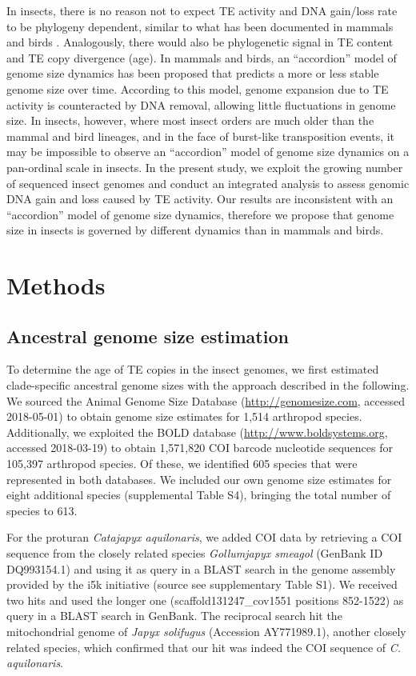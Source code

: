 In insects, there is no reason not to expect TE activity and DNA
gain/loss rate to be phylogeny dependent, similar to what has been
documented in mammals and birds \citep{Kapusta2017a}. Analogously, there
would also be phylogenetic signal in TE content and TE copy divergence
(age). In mammals and birds, an ``accordion'' model of genome size
dynamics has been proposed \citep{Kapusta2017a} that predicts a more or
less stable genome size over time. According to this model, genome
expansion due to TE activity is counteracted by DNA removal, allowing
little fluctuations in genome size. In insects, however, where most
insect orders are much older than the mammal and bird lineages, and in
the face of burst-like transposition events, it may be impossible to
observe an ``accordion'' model of genome size dynamics on a pan-ordinal
scale in insects. In the present study, we exploit the growing number of
sequenced insect genomes and conduct an integrated analysis to assess
genomic DNA gain and loss caused by TE activity. Our results are
inconsistent with an ``accordion'' model of genome size dynamics,
therefore we propose that genome size in insects is governed by
different dynamics than in mammals and birds.

\section{Methods}\label{methods}

\subsection{Ancestral genome size
estimation}\label{ancestral-genome-size-estimation}

To determine the age of TE copies in the insect genomes, we first
estimated clade-specific ancestral genome sizes with the approach
described in the following. We sourced the Animal Genome Size Database
\citep{Gregory2018} (\url{http://genomesize.com}, accessed 2018-05-01) to
obtain genome size estimates for 1,514 arthropod species. Additionally,
we exploited the BOLD database \citep{Ratnasingham2007}
(\url{http://www.boldsystems.org}, accessed 2018-03-19) to obtain
1,571,820 COI barcode nucleotide sequences for 105,397 arthropod
species. Of these, we identified 605 species that were represented in
both databases. We included our own genome size estimates for eight
additional species (supplemental Table S4), bringing the total number of
species to 613.

For the proturan \emph{Catajapyx aquilonaris}, we added COI data by
retrieving a COI sequence from the closely related species
\emph{Gollumjapyx smeagol} (GenBank ID DQ993154.1) and using it as query
in a BLAST search in the genome assembly provided by the i5k initiative
(source see supplementary Table S1). We received two hits and used the
longer one (scaffold131247\_cov1551 positions 852-1522) as query in a
BLAST search in GenBank. The reciprocal search hit the mitochondrial
genome of \emph{Japyx solifugus} (Accession AY771989.1), another closely
related species, which confirmed that our hit was indeed the COI
sequence of \emph{C. aquilonaris}.

